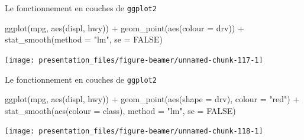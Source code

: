 \documentclass[12pt,handout,ignorenonframetext,]{beamer}
\newenvironment{Shaded}{}{}
\newcommand{\KeywordTok}[1]{\textcolor[rgb]{0.00,0.00,1.00}{#1}}
\newcommand{\DataTypeTok}[1]{#1}
\newcommand{\StringTok}[1]{\textcolor[rgb]{0.00,0.50,0.50}{#1}}
\newcommand{\OtherTok}[1]{\textcolor[rgb]{1.00,0.25,0.00}{#1}}
\newcommand{\OperatorTok}[1]{#1}
\newcommand{\NormalTok}[1]{#1}
\renewenvironment{Shaded}{\begin{snugshade}}{\end{snugshade}}
\begin{document}
\begin{frame}[fragile]{\large Le fonctionnement en \og couches \fg{} de
\texttt{ggplot2}}

\footnotesize \center

\begin{Shaded}
\begin{Highlighting}[]
\KeywordTok{ggplot}\NormalTok{(mpg, }\KeywordTok{aes}\NormalTok{(displ, hwy)) }\OperatorTok{+}\StringTok{ }
\StringTok{  }\KeywordTok{geom_point}\NormalTok{(}\KeywordTok{aes}\NormalTok{(}\DataTypeTok{colour =}\NormalTok{ drv)) }\OperatorTok{+}\StringTok{ }
\StringTok{  }\KeywordTok{stat_smooth}\NormalTok{(}\DataTypeTok{method =} \StringTok{"lm"}\NormalTok{, }\DataTypeTok{se =} \OtherTok{FALSE}\NormalTok{)}
\end{Highlighting}
\end{Shaded}

\texttt{[image: presentation\_files/figure-beamer/unnamed-chunk-117-1]}

\end{frame}

\begin{frame}[fragile]{\large Le fonctionnement en \og couches \fg{} de
\texttt{ggplot2}}

\footnotesize \center

\begin{Shaded}
\begin{Highlighting}[]
\KeywordTok{ggplot}\NormalTok{(mpg, }\KeywordTok{aes}\NormalTok{(displ, hwy)) }\OperatorTok{+}\StringTok{ }
\StringTok{  }\KeywordTok{geom_point}\NormalTok{(}\KeywordTok{aes}\NormalTok{(}\DataTypeTok{shape =}\NormalTok{ drv), }\DataTypeTok{colour =} \StringTok{"red"}\NormalTok{) }\OperatorTok{+}\StringTok{ }
\StringTok{  }\KeywordTok{stat_smooth}\NormalTok{(}\KeywordTok{aes}\NormalTok{(}\DataTypeTok{colour =}\NormalTok{ class), }\DataTypeTok{method =} \StringTok{"lm"}\NormalTok{, }\DataTypeTok{se =} \OtherTok{FALSE}\NormalTok{)}
\end{Highlighting}
\end{Shaded}

\texttt{[image: presentation\_files/figure-beamer/unnamed-chunk-118-1]}

\end{frame}
\end{document}
